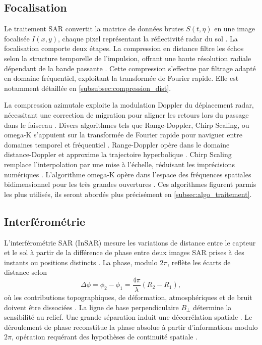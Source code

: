 \subsection{Focalisation}

Le traitement SAR convertit la matrice de données brutes $S(t,\eta)$ en une image focalisée $I(x,y)$, chaque pixel représentant la réflectivité radar du sol \cite{bamler1992comparison, cumming2005}. La focalisation comporte deux étapes. La compression en distance filtre les échos selon la structure temporelle de l'impulsion, offrant une haute résolution radiale dépendant de la bande passante \cite{cumming2005}. Cette compression s'effectue par filtrage adapté en domaine fréquentiel, exploitant la transformée de Fourier rapide. Elle est notamment détaillée en \ref{subsubsec:compression_dist}.

La compression azimutale exploite la modulation Doppler du déplacement radar, nécessitant une correction de migration pour aligner les retours lors du passage dans le faisceau \cite{rosen2000sar}. Divers algorithmes tels que Range-Doppler, Chirp Scaling, ou omega-K s'appuient sur la transformée de Fourier rapide pour naviguer entre domaines temporel et fréquentiel \cite{cumming2005, bamler1992comparison, raney1994chirp}. Range-Doppler opère dans le domaine distance-Doppler et approxime la trajectoire hyperbolique \cite{cumming2005}. Chirp Scaling remplace l'interpolation par une mise à l'échelle, réduisant les imprécisions numériques \cite{raney1994chirp}. L'algorithme omega-K opère dans l'espace des fréquences spatiales bidimensionnel pour les très grandes ouvertures \cite{bamler1992comparison}. Ces algorithmes figurent parmis les plus utilisés, ils seront abordés plus précisément en \ref{subsec:algo_traitement}.

\subsection{Interférométrie}

L'interférométrie SAR (InSAR) mesure les variations de distance entre le capteur et le sol à partir de la différence de phase entre deux images SAR prises à des instants ou positions distincts \cite{massonnet1998radar, rosen2000sar, burgmann2000sar}. La phase, modulo $2\pi$, reflète les écarts de distance selon
\begin{equation}
\Delta \phi = \phi_2 - \phi_1 = \frac{4\pi}{\lambda} (R_2 - R_1),
\label{eq:phase_interferometrique_sar}
\end{equation}
où les contributions topographiques, de déformation, atmosphériques et de bruit doivent être dissociées \cite{rosen2000sar, massonnet1998radar}. La ligne de base perpendiculaire $B_\perp$ détermine la sensibilité au relief. Une grande séparation induit une décorrélation spatiale \cite{bamler1998sar}. Le déroulement de phase reconstitue la phase absolue à partir d'informations modulo $2\pi$, opération requérant des hypothèses de continuité spatiale \cite{rosen2000sar, burgmann2000sar}.

